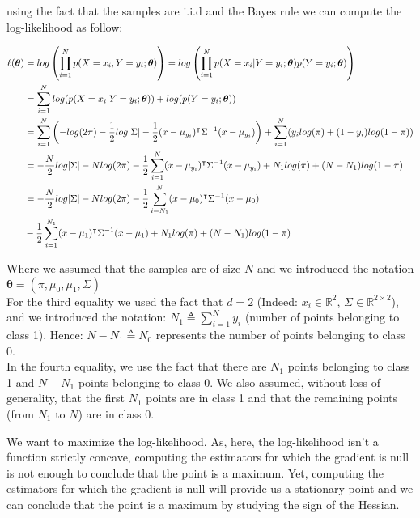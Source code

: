 \documentclass[11pt]{article}
\numberwithin{figure}{section} %
\begin{document}
using the fact that the samples are i.i.d and the Bayes rule we can compute the log-likelihood as follow:

\begin{equation}
\begin{split}
\ell(\boldsymbol{\theta}) & = log \left(\prod\limits_{i=1}^N p(X = x_i, Y = y_i; \boldsymbol{\theta} )\right) = log \left( \prod\limits_{i=1}^N p(X = x_i | Y = y_i; \boldsymbol{\theta}) p( Y = y_i; \boldsymbol{\theta} )\right) \\
 & = \sum\limits_{i = 1}^N log(p(X = x_i | Y = y_i; \boldsymbol{\theta})) + log(p( Y = y_i; \boldsymbol{\theta})) \\
 & = \sum\limits_{i=1}^N \left( - log(2\pi) - \frac{1}{2}log\abs{\Sigma} - \frac{1}{2}(x- \mu_{y_i})^{\intercal}\Sigma^{-1}(x- \mu_{y_i}) \right) + \sum\limits_{i=1}^N (y_i log(\pi) + (1-y_i) log(1 - \pi)) \\
 & = - \frac{N}{2} log\abs{\Sigma} - N log(2 \pi) - \frac{1}{2}\sum\limits_{i=1}^N (x- \mu_{y_i})^{\intercal}\Sigma^{-1}(x-\mu_{y_i}) + N_1 log(\pi) + (N - N_1) log(1 - \pi) \\
 & = - \frac{N}{2} log\abs{\Sigma} - N log(2 \pi)
- \frac{1}{2}\sum\limits_{i=N_1}^N (x- \mu_{0})^{\intercal}\Sigma^{-1}(x-\mu_{0}) \\
 & - \frac{1}{2}\sum\limits_{i=1}^{N_1} (x- \mu_{1})^{\intercal}\Sigma^{-1}(x-\mu_{1}) + 
N_1 log(\pi) + (N - N_1) log(1 - \pi) \nonumber
\end{split}
\end{equation}

Where we assumed that the samples are of size $N$ and we introduced the notation $\boldsymbol{\theta} = (\pi, \mu_0, \mu_1, \Sigma)$ \\
For the third equality we used the fact that $d=2$ (Indeed: $x_i \in \mathbb{R}^2$, $\Sigma \in \mathbb{R}^{2 \times 2}$), and we introduced the notation:
$N_1 \triangleq \sum\limits_{i=1}^N y_i$ (number of points belonging to class 1). Hence: $N - N_1 \triangleq N_0$ represents the number of points belonging to class 0. \\
In the fourth equality, we use the fact that there are $N_1$ points belonging to class 1 and $N-N_1$ points belonging to class 0. We also assumed, without loss of generality, that
the first $N_1$ points are in class 1 and that the remaining points (from $N_1$ to $N$) are in class 0.
\newline
\newline

We want to maximize the log-likelihood. As, here, the log-likelihood isn't a function strictly concave, computing the estimators for which the gradient is null is not enough
to conclude that the point is a maximum. Yet, computing the estimators for which the gradient is null will provide us a stationary point and we can conclude that the point is a maximum by studying the sign of the Hessian.
\newline
\newline
\end{document}
